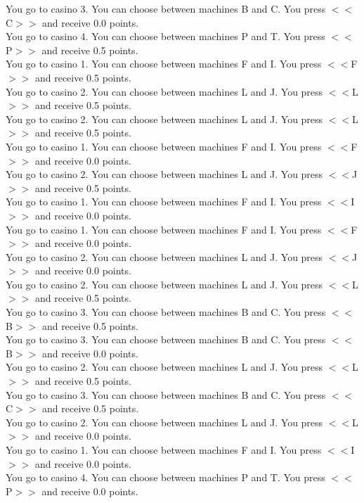 \documentclass[pdflatex,sn-nature]{sn-jnl}%
\theoremstyle{thmstyleone}%
\theoremstyle{thmstyletwo}%
\theoremstyle{thmstylethree}%
\begin{document}
You go to casino 3. You can choose between machines B and C. You press $<<$C$>>$ and receive 0.0 points. $~$\\ 
You go to casino 4. You can choose between machines P and T. You press $<<$P$>>$ and receive 0.5 points. $~$\\ 
You go to casino 1. You can choose between machines F and I. You press $<<$F$>>$ and receive 0.5 points. $~$\\ 
You go to casino 2. You can choose between machines L and J. You press $<<$L$>>$ and receive 0.5 points. $~$\\ 
You go to casino 2. You can choose between machines L and J. You press $<<$L$>>$ and receive 0.5 points. $~$\\ 
You go to casino 1. You can choose between machines F and I. You press $<<$F$>>$ and receive 0.0 points. $~$\\ 
You go to casino 2. You can choose between machines L and J. You press $<<$J$>>$ and receive 0.5 points. $~$\\ 
You go to casino 1. You can choose between machines F and I. You press $<<$I$>>$ and receive 0.0 points. $~$\\ 
You go to casino 1. You can choose between machines F and I. You press $<<$F$>>$ and receive 0.0 points. $~$\\ 
You go to casino 2. You can choose between machines L and J. You press $<<$J$>>$ and receive 0.0 points. $~$\\ 
You go to casino 2. You can choose between machines L and J. You press $<<$L$>>$ and receive 0.5 points. $~$\\ 
You go to casino 3. You can choose between machines B and C. You press $<<$B$>>$ and receive 0.5 points. $~$\\ 
You go to casino 3. You can choose between machines B and C. You press $<<$B$>>$ and receive 0.0 points. $~$\\ 
You go to casino 2. You can choose between machines L and J. You press $<<$L$>>$ and receive 0.5 points. $~$\\ 
You go to casino 3. You can choose between machines B and C. You press $<<$C$>>$ and receive 0.5 points. $~$\\ 
You go to casino 2. You can choose between machines L and J. You press $<<$L$>>$ and receive 0.0 points. $~$\\ 
You go to casino 1. You can choose between machines F and I. You press $<<$I$>>$ and receive 0.0 points. $~$\\ 
You go to casino 4. You can choose between machines P and T. You press $<<$P$>>$ and receive 0.0 points. $~$\\ 
\end{document}

